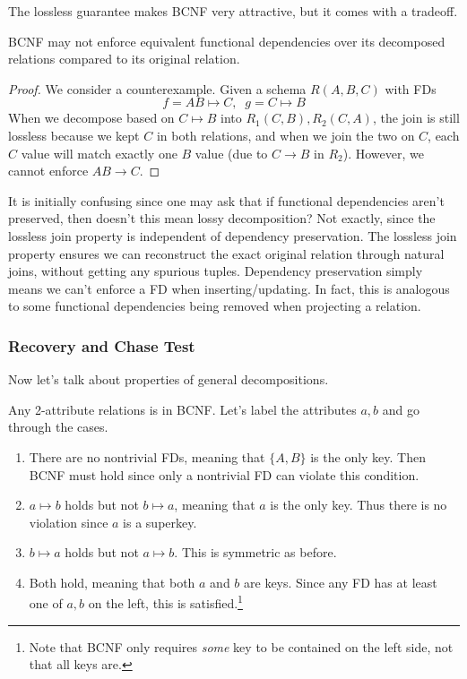   The lossless guarantee makes BCNF very attractive, but it comes with a tradeoff. 

  \begin{theorem}
    \label{thm:bcnf-does-not-preserve-functional-dependencies}
    BCNF may not enforce equivalent functional dependencies over its decomposed relations compared to its original relation. 
  \end{theorem}
  \begin{proof}
    We consider a counterexample. Given a schema $R(A, B, C)$ with FDs 
    \begin{equation}
      f = AB \mapsto C, \;\; g = C \mapsto B
    \end{equation} 
    When we decompose based on $C \mapsto B$ into $R_1 (C, B), R_2(C, A)$, the join is still lossless because we kept $C$ in both relations, and when we join the two on $C$, each $C$ value will match exactly one $B$ value (due to $C \rightarrow B$ in $R_2$). However, we cannot enforce $AB \rightarrow C$. 
  \end{proof}

  It is initially confusing since one may ask that if functional dependencies aren't preserved, then doesn't this mean lossy decomposition? Not exactly, since the lossless join property is independent of dependency preservation. The lossless join property ensures we can reconstruct the exact original relation through natural joins, without getting any spurious tuples. Dependency preservation simply means we can't enforce a FD when inserting/updating. In fact, this is analogous to some functional dependencies being removed when projecting a relation. 

\subsubsection{Recovery and Chase Test} 

  Now let's talk about properties of general decompositions. 

  \begin{theorem}
    \label{thm:any-2-attribute-relation-satisfies-bncf}
    Any 2-attribute relations is in BCNF. Let's label the attributes $a, b$ and go through the cases. 
    \begin{enumerate}
      \item There are no nontrivial FDs, meaning that $\{A, B\}$ is the only key. Then BCNF must hold since only a nontrivial FD can violate this condition. 
      \item $a \mapsto b$ holds but not $b \mapsto a$, meaning that $a$ is the only key. Thus there is no violation since $a$ is a superkey. 
      \item $b \mapsto a$ holds but not $a \mapsto b$. This is symmetric as before. 
      \item Both hold, meaning that both $a$ and $b$ are keys. Since any FD has at least one of $a, b$ on the left, this is satisfied.\footnote{Note that BCNF only requires \textit{some} key to be contained on the left side, not that all keys are. } 
    \end{enumerate}
  \end{theorem}

